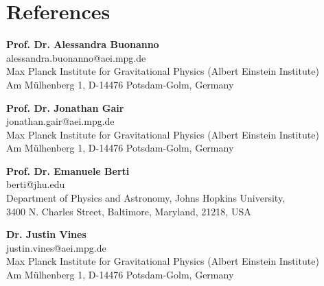 \documentclass[11pt,a4paper,sans]{moderncv}        %
\begin{document}
\vspace{5pt}

	\section{References}

    \vspace{7pt}
    
\textbf{Prof. Dr. Alessandra Buonanno}\\
alessandra.buonanno@aei.mpg.de\\
Max Planck Institute for Gravitational Physics (Albert Einstein Institute)\\
Am Mülhenberg 1, D-14476 Potsdam-Golm, Germany

    \vspace{7pt}

\textbf{Prof. Dr. Jonathan Gair}\\
jonathan.gair@aei.mpg.de\\
Max Planck Institute for Gravitational Physics (Albert Einstein Institute)\\
Am Mülhenberg 1, D-14476 Potsdam-Golm, Germany

    \vspace{7pt}

\textbf{Prof. Dr. Emanuele Berti}\\
berti@jhu.edu\\
Department of Physics and Astronomy, Johns Hopkins University,\\
3400 N. Charles Street, Baltimore, Maryland, 21218, USA
    
%    
    
        \vspace{7pt}
    
    \textbf{Dr. Justin Vines}\\
    justin.vines@aei.mpg.de\\
    Max Planck Institute for Gravitational Physics (Albert Einstein Institute)\\
    Am Mülhenberg 1, D-14476 Potsdam-Golm, Germany
    
%	
	
\end{document}
